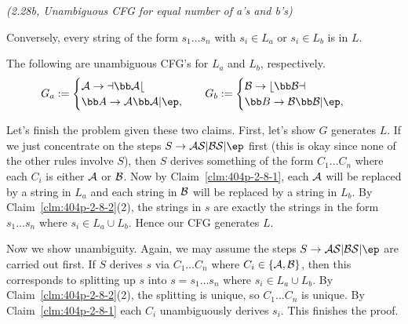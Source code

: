 \begin{problem}{\it (2.28b, Unambiguous CFG for equal number of a's and b's)}
\begin{clm}
\begin{enumerate}
Conversely, every string of the form $s_1\ldots s_n$ with $s_i\in L_a$ or $s_i\in L_b$ is in $L$.
\end{enumerate}
\end{clm}
\begin{clm}
The following are unambiguous CFG's for $L_a$ and $L_b$, respectively.
\begin{align*}
G_a&:=\begin{cases}
\cal A\to a\bb A b\\
\bb A\to \cal A \bb A|\ep,
\end{cases}&
G_b&:=\begin{cases}
\cal B\to b\bb B a\\
\bb B\to \cal B \bb B|\ep,
\end{cases}
\end{align*}
\end{clm}
Let's finish the problem given these two claims. First, let's show $G$ generates $L$. 
If we just concentrate on the steps $S\to \cal A S|\cal BS|\ep$ first (this is okay since none of the other rules involve $S$), then $S$ derives something of the form $C_1\ldots C_n$ where each $C_i$ is either $\cal A$ or $\cal B$. Now by Claim~\ref{clm:404p-2-8-1}, each $\cal A$ will be replaced by a string in $L_a$ and each string in $\cal B$ will be replaced by a string in $L_b$. 
By Claim~\ref{clm:404p-2-8-2}(2), the strings in $s$ are exactly the strings in the form $s_1\ldots s_n$ where $s_i\in L_a\cup L_b$. Hence our CFG generates $L$.

Now we show unambiguity. Again, we may assume the steps $S\to \cal AS|\cal BS|\ep$ are carried out first. 
If $S$ derives $s$ via $C_1\ldots C_n$ where $C_i\in \{\cal A,\cal B\}$, then this corresponds to splitting up $s$ into $s=s_1\ldots s_n$ where $s_i\in L_a\cup L_b$. By Claim~\ref{clm:404p-2-8-2}(2), the splitting is unique, so $C_1\ldots C_n$ is unique. By Claim~\ref{clm:404p-2-8-1} each $C_i$ unambiguously derives $s_i$. This finishes the proof.


\end{problem}
